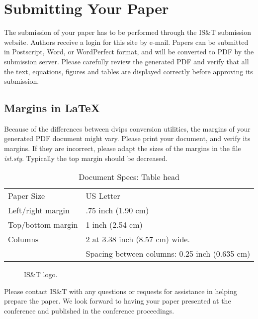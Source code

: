 \documentclass[letterpaper,twocolumn,fleqn]{article}
\begin{document}

\section{Submitting Your Paper}
The submission of your paper has to be performed through the IS\&T
submission website. Authors receive a login for this site by e-mail.
Papers can be submitted in Postscript, Word, or WordPerfect format,
and will be converted to PDF by the submission server. Please
carefully review the generated PDF and verify that all the text,
equations, figures and tables are displayed correctly before approving
its submission.

\subsection{Margins in LaTeX}
Because of the differences between dvips conversion utilities, the
margins of your generated PDF document might vary. Please print
your document, and verify its margins. If they are incorrect, please
adapt the sizes of the margins in the file \emph{ist.sty}. Typically the
top margin should be decreased.

\begin{table}[!ht]
\caption{Document Specs: Table head}
\label{tab:specs}
\begin{center}       
\begin{tabular}{p{}p{}} 
Paper Size & US Letter \\
Left/right margin & .75 inch (1.90 cm) \\
Top/bottom margin & 1 inch (2.54 cm) \\
Columns & 2 at 3.38 inch (8.57 cm) wide. \\
 & Spacing between columns: 0.25 inch (0.635 cm)
\end{tabular}
\end{center}
\end{table} 

\begin{figure}[!hb]
  \caption{IS\&T logo.}
  \label{Figure:logo}
\end{figure}

Please contact IS\&T with any questions or requests for assistance in
helping prepare the paper. We look forward to having your paper
presented at the conference and published in the conference
proceedings.
\end{document}
